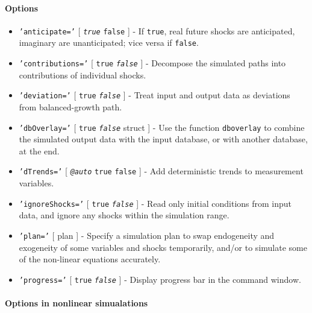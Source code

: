 \paragraph{Options}\label{options}

\begin{itemize}
\item
  \texttt{'anticipate='} {[} \emph{\texttt{true}} \textbar{}
  \texttt{false} {]} - If \texttt{true}, real future shocks are
  anticipated, imaginary are unanticipated; vice versa if
  \texttt{false}.
\item
  \texttt{'contributions='} {[} \texttt{true} \textbar{}
  \emph{\texttt{false}} {]} - Decompose the simulated paths into
  contributions of individual shocks.
\item
  \texttt{'deviation='} {[} \texttt{true} \textbar{}
  \emph{\texttt{false}} {]} - Treat input and output data as deviations
  from balanced-growth path.
\item
  \texttt{'dbOverlay='} {[} \texttt{true} \textbar{}
  \emph{\texttt{false}} \textbar{} struct {]} - Use the function
  \texttt{dboverlay} to combine the simulated output data with the input
  database, or with another database, at the end.
\item
  \texttt{'dTrends='} {[} \emph{\texttt{@auto}} \textbar{} \texttt{true}
  \textbar{} \texttt{false} {]} - Add deterministic trends to
  measurement variables.
\item
  \texttt{'ignoreShocks='} {[} \texttt{true} \textbar{}
  \emph{\texttt{false}} {]} - Read only initial conditions from input
  data, and ignore any shocks within the simulation range.
\item
  \texttt{'plan='} {[} plan {]} - Specify a simulation plan to swap
  endogeneity and exogeneity of some variables and shocks temporarily,
  and/or to simulate some of the non-linear equations accurately.
\item
  \texttt{'progress='} {[} \texttt{true} \textbar{}
  \emph{\texttt{false}} {]} - Display progress bar in the command
  window.
\end{itemize}

\paragraph{Options in nonlinear
simualations}\label{options-in-nonlinear-simualations}

